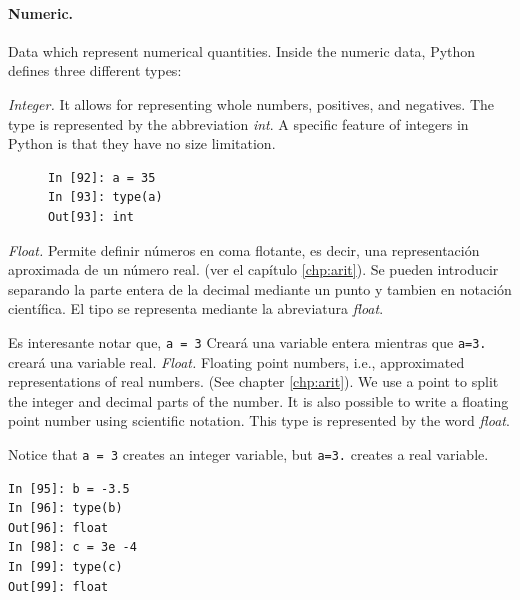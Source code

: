 \begin{paracol}{2}
\paragraph{Numeric.} Data which represent numerical quantities. Inside the numeric data, Python defines three different types:

\emph{Integer.} It allows for representing whole numbers, positives, and negatives. The type is represented by the abbreviation \emph{int}. A specific feature of integers in Python is that they have no size limitation.
\end{paracol}

\begin{figure}[thp]
\centering
\begin{minipage}{0.2\textwidth}
\begin{verbatim}
In [92]: a = 35
In [93]: type(a)
Out[93]: int
\end{verbatim}
\end{minipage}
\end{figure}
\begin{paracol}{2}   
\emph{Float.} Permite definir números en coma flotante, es decir, una representación aproximada de un número real. (ver el capítulo \ref{chp:arit}). Se pueden introducir separando la parte entera de la decimal mediante un punto y tambien en notación científica. El tipo se representa mediante la abreviatura \emph{float}.

Es interesante notar que, \texttt{a = 3} Creará una variable entera mientras que \texttt{a=3.} creará una variable real.
\switchcolumn
\emph{Float.} Floating point numbers, i.e., approximated representations of real numbers. (See chapter \ref{chp:arit}). We use a point to split the integer and decimal parts of the number. It is also possible to write a floating point number using scientific notation. This type is represented by the word \emph{float}.

Notice that \texttt{a = 3} creates an integer variable, but \texttt{a=3.} creates a real variable. 
\end{paracol}

\begin{center}
\begin{minipage}{0.2\textwidth}
\begin{verbatim}
In [95]: b = -3.5
In [96]: type(b)
Out[96]: float
In [98]: c = 3e -4
In [99]: type(c)
Out[99]: float
\end{verbatim}
\end{minipage}
\end{center}


